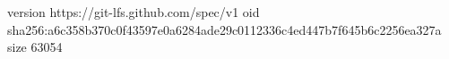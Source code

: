 version https://git-lfs.github.com/spec/v1
oid sha256:a6c358b370c0f43597e0a6284ade29c0112336c4ed447b7f645b6c2256ea327a
size 63054

